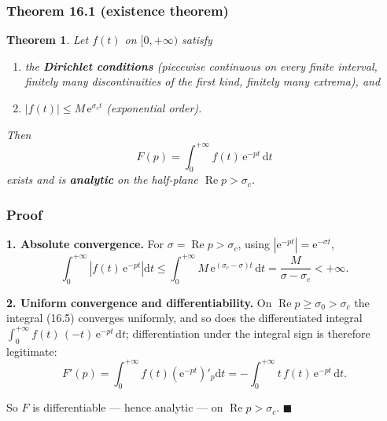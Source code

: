 \documentclass[11pt,a4paper]{article}
\theoremstyle{definition}
\theoremstyle{plain}
\newtheorem{theorem}{Theorem}[section]
\begin{document}
\subsubsection{Theorem 16.1 (existence theorem)}

\begin{theorem}
Let $f(t)$ on $[0,+\infty)$ satisfy
\begin{enumerate}
    \item the \textbf{Dirichlet conditions} (piecewise continuous on every finite interval,
          finitely many discontinuities of the first kind, finitely many extrema), and
    \item $\left|f(t)\right|\le M\,\mathrm{e}^{\sigma_c t}$ (exponential order).
\end{enumerate}
Then
\begin{equation}
F(p)=\int_{0}^{+\infty} f(t)\,\mathrm{e}^{-pt}\,\mathrm{d}t \tag{16.5}
\end{equation}
exists and is \textbf{analytic} on the half-plane $\operatorname{Re}p>\sigma_c$.
\end{theorem}

\subsubsection{Proof}

\textbf{1. Absolute convergence.} For $\sigma=\operatorname{Re}p>\sigma_c$, using
$\left|\mathrm{e}^{-pt}\right|=\mathrm{e}^{-\sigma t}$,
\begin{equation}
\int_{0}^{+\infty}\left|f(t)\,\mathrm{e}^{-pt}\right|\mathrm{d}t
\le \int_{0}^{+\infty} M\,\mathrm{e}^{(\sigma_c-\sigma)t}\,\mathrm{d}t
=\frac{M}{\sigma-\sigma_c}<+\infty . \tag{16.6}
\end{equation}

\textbf{2. Uniform convergence and differentiability.} On $\operatorname{Re}p\ge\sigma_0>\sigma_c$
the integral (16.5) converges uniformly, and so does the differentiated integral
$\int_{0}^{+\infty} f(t)\,(-t)\,\mathrm{e}^{-pt}\,\mathrm{d}t$; differentiation under the integral
sign is therefore legitimate:
\begin{equation}
F'(p)=\int_{0}^{+\infty} f(t)\left(\mathrm{e}^{-pt}\right)'_{p}\mathrm{d}t
=-\int_{0}^{+\infty} t\,f(t)\,\mathrm{e}^{-pt}\,\mathrm{d}t . \tag{16.7}
\end{equation}

So $F$ is differentiable --- hence analytic --- on $\operatorname{Re}p>\sigma_c$.
\hfill$\blacksquare$
\end{document}
